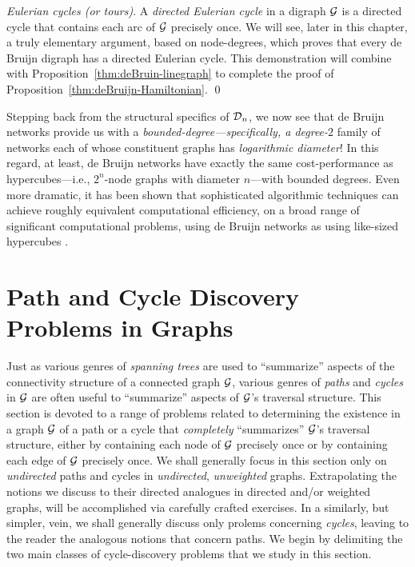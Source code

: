 \medskip

{\it Eulerian cycles (or tours)}. 
 A {\it directed Eulerian cycle} in a digraph
$\mbox{$\cal G$}$ is a directed cycle that contains each arc of $\mbox{$\cal G$}$ precisely
once.  We will see, later in this chapter, a truly elementary
argument, based on node-degrees, which proves that every de Bruijn
digraph has a directed Eulerian cycle.  This demonstration will
combine with Proposition~\ref{thm:deBruin-linegraph} to complete the
proof of Proposition~\ref{thm:deBruijn-Hamiltonian}.  \qed

\bigskip

Stepping back from the structural specifics of $\mbox{$\cal D$}_n$, we now see that
de Bruijn networks provide us with a {\em
  bounded-degree---specifically, a degree-$2$} family of networks each
of whose constituent graphs has {\em logarithmic diameter}!  In this
regard, at least, de Bruijn networks have exactly the same
cost-performance as hypercubes---i.e., $2^n$-node graphs with diameter
$n$---with bounded degrees.  Even more dramatic, it has been shown
that sophisticated algorithmic techniques can achieve roughly
equivalent computational efficiency, on a broad range of significant
computational problems, using de Bruijn networks as using like-sized
hypercubes \cite{AnnexsteinBR90, BermondP89, Ullman84}.


\section{Path and Cycle Discovery Problems in Graphs}
\label{sec:path-cycle-problems}

Just as various genres of {\it spanning trees} are used to
``summarize'' aspects of the connectivity structure of a connected
graph $\mbox{$\cal G$}$, various genres of {\it paths} and {\it cycles} in $\mbox{$\cal G$}$ are
often useful to ``summarize'' aspects of $\mbox{$\cal G$}$'s traversal structure.
This section is devoted to a range of problems related to determining
the existence in a graph $\mbox{$\cal G$}$ of a path or a cycle that {\em
  completely} ``summarizes'' $\mbox{$\cal G$}$'s traversal structure, either by
containing each node of $\mbox{$\cal G$}$ precisely once or by containing each edge
of $\mbox{$\cal G$}$ precisely once.  We shall generally focus in this section only
on {\em undirected} paths and cycles in {\em undirected}, {\em
  unweighted} graphs.  Extrapolating the notions we discuss to their
directed analogues in directed and/or weighted graphs, will be
accomplished via carefully crafted exercises.  In a similarly, but
simpler, vein, we shall generally discuss only prolems concerning {\em
  cycles}, leaving to the reader the analogous notions that concern
paths.  We begin by delimiting the two main classes of cycle-discovery
problems that we study in this section.

